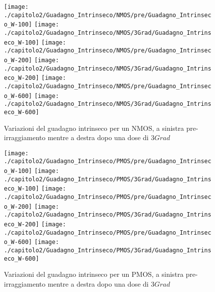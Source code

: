 \begin{figure}[ht]
    \centering
    \texttt{[image: ./capitolo2/Guadagno\_Intrinseco/NMOS/pre/Guadagno\_Intrinseco\_W-100]}
    \texttt{[image: ./capitolo2/Guadagno\_Intrinseco/NMOS/3Grad/Guadagno\_Intrinseco\_W-100]}
    \texttt{[image: ./capitolo2/Guadagno\_Intrinseco/NMOS/pre/Guadagno\_Intrinseco\_W-200]}
    \texttt{[image: ./capitolo2/Guadagno\_Intrinseco/NMOS/3Grad/Guadagno\_Intrinseco\_W-200]}
    \texttt{[image: ./capitolo2/Guadagno\_Intrinseco/NMOS/pre/Guadagno\_Intrinseco\_W-600]}
    \texttt{[image: ./capitolo2/Guadagno\_Intrinseco/NMOS/3Grad/Guadagno\_Intrinseco\_W-600]}

    \caption[Variazione del guadagno intrinseco pre e pos irraggimento NMOS]{Variazioni del guadagno intrinseco per un NMOS, a sinistra pre-irraggiamento mentre a destra dopo una dose di $3Grad$}
    \label{fig:guadagnoIntrinseco_N}
\end{figure}


\begin{figure}[ht]
    \centering
    \texttt{[image: ./capitolo2/Guadagno\_Intrinseco/PMOS/pre/Guadagno\_Intrinseco\_W-100]}
    \texttt{[image: ./capitolo2/Guadagno\_Intrinseco/PMOS/3Grad/Guadagno\_Intrinseco\_W-100]}
    \texttt{[image: ./capitolo2/Guadagno\_Intrinseco/PMOS/pre/Guadagno\_Intrinseco\_W-200]}
    \texttt{[image: ./capitolo2/Guadagno\_Intrinseco/PMOS/3Grad/Guadagno\_Intrinseco\_W-200]}
    \texttt{[image: ./capitolo2/Guadagno\_Intrinseco/PMOS/pre/Guadagno\_Intrinseco\_W-600]}
    \texttt{[image: ./capitolo2/Guadagno\_Intrinseco/PMOS/3Grad/Guadagno\_Intrinseco\_W-600]}

    \caption[Variazione del guadagno intrinseco pre e pos irraggimento PMOS]{Variazioni del guadagno intrinseco per un PMOS, a sinistra pre-irraggiamento mentre a destra dopo una dose di $3Grad$}
    \label{fig:guadagnoIntrinseco_P}
\end{figure}